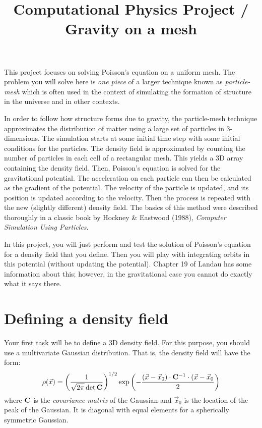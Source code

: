 \documentclass[11pt, preprint]{aastex}
\begin{document}
\title{\bf Computational Physics Project / Gravity on a mesh}

This project focuses on solving Poisson's equation on a uniform mesh.
The problem you will solve here is {\it one piece} of a larger
technique known as {\it particle-mesh} which is often used in the
context of simulating the formation of structure in the universe and
in other contexts. 

In order to follow how structure forms due to gravity, the
particle-mesh technique approximates the distribution of matter using
a large set of particles in 3-dimensions. The simulation starts at
some initial time step with some initial conditions for the
particles. The density field is approximated by counting the number of
particles in each cell of a rectangular mesh. This yields a 3D array
containing the density field. Then, Poisson's equation is solved for
the gravitational potential. The acceleration on each particle can
then be calculated as the gradient of the potential. The velocity of
the particle is updated, and its position is updated according to the
velocity. Then the process is repeated with the new (slightly
different) density field. The basics of this method were described
thoroughly in a classic book by Hockney \& Eastwood (1988), {\it
  Computer Simulation Using Particles}.

In this project, you will just perform and test the solution of
Poisson's equation for a density field that you define. Then you will
play with integrating orbits in this potential (without updating the
potential). Chapter 19 of Landau has some information about this;
however, in the gravitational case you cannot do exactly what it says
there.

\section{Defining a density field}

Your first task will be to define a 3D density field. For this
purpose, you should use a multivariate Gaussian distribution. That is,
the density field will have the form:
\begin{equation}
\rho(\vec{x}) = \left(\frac{1}{\sqrt{2\pi} \det{\bf C}}\right)^{1/2}
\exp\left(-\frac{(\vec{x}-\vec{x}_0)\cdot{\bf
    C}^{-1}\cdot(\vec{x}-\vec{x}_0}{2}\right)
\end{equation}
where ${\bf C}$ is the {\it covariance matrix} of the Gaussian and
$\vec{x}_0$ is the location of the peak of the Gaussian. It is
diagonal with equal elements for a spherically symmetric Gaussian.
\end{document}
